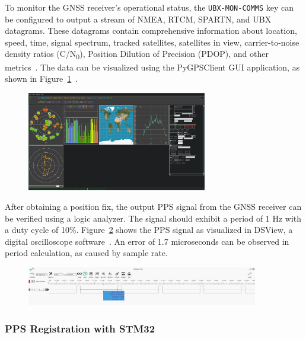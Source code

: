 \documentclass[12pt, a4paper]{extarticle}
\begin{document}
To monitor the GNSS receiver's operational status, the \texttt{UBX-MON-COMMS} key can be
configured to output a stream of NMEA, RTCM, SPARTN, and UBX datagrams. These
datagrams contain comprehensive information about location, speed, time, signal
spectrum, tracked satellites, satellites in view, carrier-to-noise density
ratios (C/N\textsubscript{0}), Position Dilution of Precision (PDOP), and
other metrics~\cite{m10-id}. The data can be visualized using the PyGPSClient GUI
application, as shown in Figure~\ref{fig:pygpsclient-fix}~\cite{pygpsclient}.

\begin{figure}[H]
    \centering
    \includegraphics[width=0.7\textwidth]{pygpsclient}
    \captionsetup{width=0.8\textwidth}
    \label{fig:pygpsclient-fix}
\end{figure}

After obtaining a position fix, the output PPS signal from the GNSS receiver
can be verified using a logic analyzer. The signal should exhibit a period of 1
Hz with a duty cycle of 10\%. Figure~\ref{fig:pps-dsview} shows the PPS signal
as visualized in DSView, a digital oscilloscope software~\cite{dsview}. An
error of 1.7 microseconds can be observed in period calculation, as
caused by sample rate.

\begin{figure}[h]
    \centering
    \includegraphics[width=0.9\textwidth]{dsview}
    \captionsetup{width=0.8\textwidth}
    \label{fig:pps-dsview}
\end{figure}

\subsubsection{PPS Registration with STM32}\label{sec:stm-pps-basic}
\end{document}
